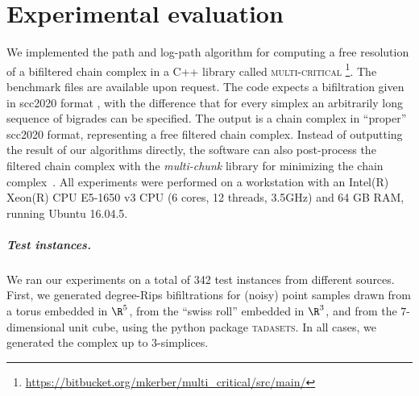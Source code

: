 \section{Experimental evaluation}
\label{sec:experiments}
%
We implemented the path and log-path algorithm for computing a free resolution
of a bifiltered chain complex 
in a C++ library called \textsc{multi-critical} \footnote{\url{https://bitbucket.org/mkerber/multi_critical/src/main/}}. The benchmark files are available upon request.  
The code expects a bifiltration given in
scc2020 format \cite{scc2020}%
, with the difference that for every simplex an arbitrarily long
sequence of bigrades can be specified.
The output is a chain complex in ``proper''
scc2020 format, representing a free filtered chain complex.
Instead
of outputting the result of our algorithms directly, the software can also
post-process the filtered chain complex with the \emph{multi-chunk} \cite{multi_chunk}
library for minimizing the chain complex~\cite{fk-chunk,fkr-compression}. 
%
All experiments were performed on a workstation with an Intel(R) Xeon(R) CPU E5-1650 v3 CPU (6 cores, 12 threads, 3.5GHz) and 64 GB RAM, running Ubuntu 16.04.5.
%
\subparagraph{Test instances.}
%
We ran our experiments on a total of 342 test instances from different
sources.
First, we generated degree-Rips bifiltrations
for (noisy) point samples drawn from a torus
embedded in $\R^5$, from the ``swiss roll'' embedded in $\R^3$,
and from the $7$-dimensional unit cube, using the python package \textsc{tadasets}.
In all cases, we generated the complex up to $3$-simplices.
